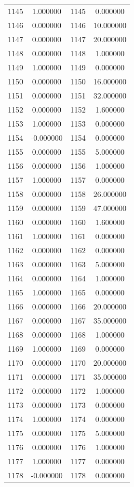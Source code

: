 \documentclass[12pt]{article}
\begin{document}
\begin{longtable}{@{}cccc@{}}
1145 & 1.000000 & 1145 & 0.000000 \\
1146 & 0.000000 & 1146 & 10.000000 \\
1147 & 0.000000 & 1147 & 20.000000 \\
1148 & 0.000000 & 1148 & 1.000000 \\
1149 & 1.000000 & 1149 & 0.000000 \\
1150 & 0.000000 & 1150 & 16.000000 \\
1151 & 0.000000 & 1151 & 32.000000 \\
1152 & 0.000000 & 1152 & 1.600000 \\
1153 & 1.000000 & 1153 & 0.000000 \\
1154 & -0.000000 & 1154 & 0.000000 \\
1155 & 0.000000 & 1155 & 5.000000 \\
1156 & 0.000000 & 1156 & 1.000000 \\
1157 & 1.000000 & 1157 & 0.000000 \\
1158 & 0.000000 & 1158 & 26.000000 \\
1159 & 0.000000 & 1159 & 47.000000 \\
1160 & 0.000000 & 1160 & 1.600000 \\
1161 & 1.000000 & 1161 & 0.000000 \\
1162 & 0.000000 & 1162 & 0.000000 \\
1163 & 0.000000 & 1163 & 5.000000 \\
1164 & 0.000000 & 1164 & 1.000000 \\
1165 & 1.000000 & 1165 & 0.000000 \\
1166 & 0.000000 & 1166 & 20.000000 \\
1167 & 0.000000 & 1167 & 35.000000 \\
1168 & 0.000000 & 1168 & 1.000000 \\
1169 & 1.000000 & 1169 & 0.000000 \\
1170 & 0.000000 & 1170 & 20.000000 \\
1171 & 0.000000 & 1171 & 35.000000 \\
1172 & 0.000000 & 1172 & 1.000000 \\
1173 & 0.000000 & 1173 & 0.000000 \\
1174 & 1.000000 & 1174 & 0.000000 \\
1175 & 0.000000 & 1175 & 5.000000 \\
1176 & 0.000000 & 1176 & 1.000000 \\
1177 & 1.000000 & 1177 & 0.000000 \\
1178 & -0.000000 & 1178 & 0.000000 \\

\end{longtable}
\end{document}
